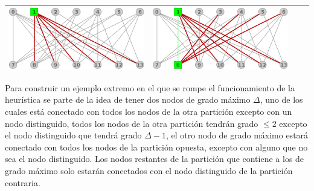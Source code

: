\begin{center}
\begin{tabular}{ |c||c||c||c| }
		\includegraphics[scale = 0.18]{img/ej3/constructiva_golosa/bipartito2_st11.png} &
		\includegraphics[scale = 0.18]{img/ej3/constructiva_golosa/bipartito2_st12.png} \\
		\hline
		\end{tabular}
	\end{center}
	
	Para construir un ejemplo extremo 
	en el que se rompe el funcionamiento de la heur\'istica se parte de la idea de tener dos nodos
	de grado m\'aximo $\Delta$, uno de los cuales est\'a conectado con todos los nodos de la otra
	partici\'on excepto con un nodo distinguido, todos los nodos de la otra partici\'on tendr\'an
	grado $\leq 2$ excepto el nodo distinguido que tendr\'a grado $\Delta -1$, el otro nodo de grado
	m\'aximo estar\'a conectado con todos los nodos de la partici\'on opuesta, excepto con alguno
	que no sea el nodo distinguido. Los nodos restantes de la partici\'on que contiene a los de 
	grado m\'aximo solo estar\'an conectados con el nodo distinguido de la partici\'on contraria.

